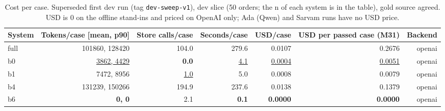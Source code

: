 \begin{table}[t]
\centering
\small
\caption{Cost per case. Superseded first dev run (tag \texttt{dev-sweep-v1}), dev slice (50 orders; the n of each system is in the table), gold source agreed. USD is 0 on the offline stand-ins and priced on OpenAI only; Ada (Qwen) and Sarvam runs have no USD price.}
\label{tab:table9_cost}
\begin{adjustbox}{max width=\textwidth}
\begin{tabular}{lrrrrrr}
\toprule
System & Tokens/case [mean, p90] & Store calls/case & Seconds/case & USD/case & USD per passed case (M31) & Backend \\
\midrule
full & 101860, 128420 & 104.0 & 279.6 & 0.0107 & 0.2676 & openai \\
b0 & \underline{3862, 4429} & \textbf{0.0} & \underline{4.1} & \underline{0.0004} & \underline{0.0051} & openai \\
b1 & 7472, 8956 & \underline{1.0} & 5.0 & 0.0008 & 0.0079 & openai \\
b4 & 131239, 150266 & 194.9 & 237.6 & 0.0138 & 0.1379 & openai \\
b6 & \textbf{0, 0} & 2.1 & \textbf{0.1} & \textbf{0.0000} & \textbf{0.0000} & openai \\
\bottomrule
\end{tabular}
\end{adjustbox}
\end{table}
